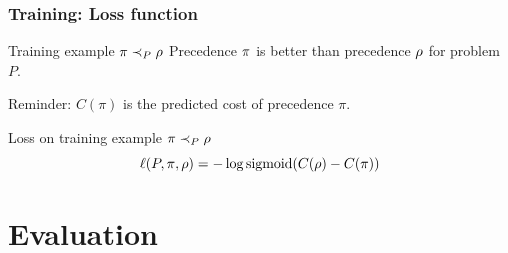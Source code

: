 \documentclass[a4paper]{beamer}
\def\FuncSigmoid(#1){1.0/(1.0 + exp(-(#1)))}
\begin{document}
\begin{frame}
\frametitle{Training: Loss function}

\begin{exampleblock}{Training example $\pi \prec_{P} \rho$}
Precedence $\pi$ is better than precedence $\rho$ for problem $P$.
\end{exampleblock}

Reminder: $C(\pi)$ is the predicted cost of precedence $\pi$.

\begin{block}{Loss on training example $\pi \prec_{P} \rho$}
\begin{equation*}
\ell(P, \pi, \rho) = - \log \operatorname{sigmoid} (C(\rho) - C(\pi))
\end{equation*}

\centering
\end{block}

\end{frame}

\section{Evaluation}
\end{document}
